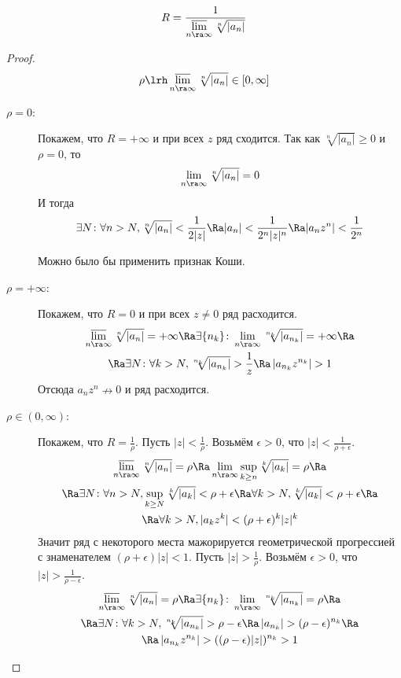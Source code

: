 \begin{theorem}
	\[ R = \frac1{\varlimsup\limits_{n \ra \infty} \sqrt[n]{|a_n|}} \]
\end{theorem}
\begin{proof}
	\[ \rho \lrh \varlimsup\limits_{n \ra \infty} \sqrt[n]{|a_n|} \in [0, \infty] \]
	\begin{description}
	\item[$\rho = 0$:]
		Покажем, что $R = +\infty$ и при всех $z$ ряд сходится.
		Так как $\sqrt[n]{|a_n|} \ge 0$ и $\rho = 0$, то
		\[ \lim_{n \ra \infty} \sqrt[n]{|a_n|} = 0 \]
		И тогда
		\[ \exists N\colon \forall n > N, \sqrt[n]{|a_n|} < \frac1{2|z|} \Ra |a_n| < \frac1{2^n|z|^n} \Ra |a_nz^n| < \frac1{2^n} \]
		\begin{Rem}
			Можно было бы применить признак Коши.
		\end{Rem}

	\item[$\rho = +\infty$:]
		Покажем, что $R = 0$ и при всех $z \ne 0$ ряд расходится.
		\begin{gather*}
			\varlimsup\limits_{n \ra \infty} \sqrt[n]{|a_n|} = +\infty
			\Ra \exists \{n_k\}\colon \lim_{n \ra \infty} \sqrt[n_k]{\left|a_{n_k}\right|} = +\infty \Ra \\
			\Ra \exists N\colon \forall k > N, \sqrt[n_k]{\left|a_{n_k}\right|} > \frac1z \Ra \left|a_{n_k} z^{n_k}\right| > 1
		\end{gather*}
		Отсюда $a_n z^n \nrightarrow 0$ и ряд расходится.

	\item[$\rho \in (0, \infty)$:]
		Покажем, что $R = \frac1\rho$.
		Пусть $|z| < \frac1\rho$.
		Возьмём $\epsilon > 0$, что $|z| < \frac1{\rho + \epsilon}$.
		\begin{gather*}
			\varlimsup\limits_{n \ra \infty} \sqrt[n]{|a_n|} = \rho
			\Ra \lim_{n \ra \infty} \sup_{k \ge n} \sqrt[k]{|a_k|} = \rho \Ra \\
			\Ra \exists N\colon \forall n > N, \sup_{k \ge N} \sqrt[k]{|a_k|} < \rho + \epsilon
			\Ra \forall k > N, \sqrt[k]{|a_k|} < \rho + \epsilon \Ra \\
			\Ra \forall k > N, |a_k z^k| < (\rho + \epsilon)^k |z|^k
		\end{gather*}
		Значит ряд с некоторого места мажорируется геометрической прогрессией с знаменателем $(\rho+\epsilon)|z| < 1$.
		Пусть $|z| > \frac1\rho$.
		Возьмём $\epsilon > 0$, что $|z| > \frac1{\rho - \epsilon}$.
		\begin{gather*}
			\varlimsup\limits_{n \ra \infty} \sqrt[n]{|a_n|} = \rho
			\Ra \exists \{n_k\}\colon \lim_{n \ra \infty} \sqrt[n_k]{\left|a_{n_k}\right|} = \rho \Ra \\
			\Ra \exists N\colon \forall k > N, \sqrt[n_k]{\left|a_{n_k}\right|} > \rho - \epsilon
			\Ra \left|a_{n_k}\right| > (\rho - \epsilon)^{n_k} \Ra \\
			\Ra \left|a_{n_k} z^{n_k}\right| > ((\rho - \epsilon)|z|)^{n_k} > 1
		\end{gather*}
	\end{description}
\end{proof}
